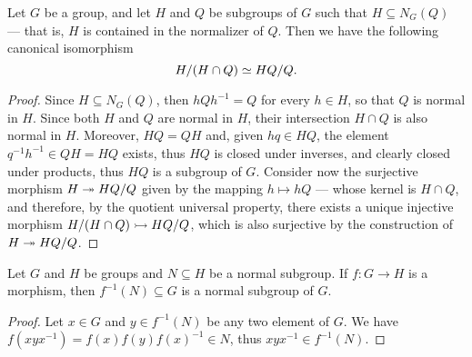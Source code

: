 \begin{corollary}
\label{cor:grp-intersection-coset-isomorphism}
Let \(G\) be a group, and let \(H\) and \(Q\) be subgroups of \(G\) such that
\(H \subseteq N_G(Q)\) --- that is, \(H\) is contained in the normalizer of
\(Q\). Then we have the following canonical isomorphism
\[
  H/(H \cap Q) \simeq H Q / Q.
\]
\end{corollary}

\begin{proof}
Since \(H \subseteq N_G(Q)\), then \(hQh^{-1} = Q\) for every \(h \in H\), so
that \(Q\) is normal in \(H\). Since both \(H\) and \(Q\) are normal in \(H\),
their intersection \(H \cap Q\) is also normal in \(H\). Moreover, \(HQ = QH\)
and, given \(hq \in HQ\), the element \(q^{-1} h^{-1} \in Q H = H Q\) exists, thus
\(HQ\) is closed under inverses, and clearly closed under products, thus \(HQ\)
is a subgroup of \(G\). Consider now the surjective morphism \(H \twoheadrightarrow H Q / Q\)
given by the mapping \(h \mapsto h Q\) --- whose kernel is \(H \cap Q\), and
therefore, by the quotient universal property, there exists a unique injective
morphism \(H/(H \cap Q) \rightarrowtail HQ/Q\), which is also surjective by the
construction of \(H \twoheadrightarrow H Q / Q\).
\end{proof}

\begin{proposition}
\label{prop:morphisms-preserve-normality}
Let \(G\) and \(H\) be groups and \(N \subseteq H\) be a normal subgroup. If
\(f: G \to H\) is a morphism, then \(f^{-1}(N) \subseteq G\) is a normal
subgroup of \(G\).
\end{proposition}

\begin{proof}
Let \(x \in G\) and \(y \in f^{-1}(N)\) be any two element of \(G\). We have
\(f(x y x^{-1}) = f(x) f(y) f(x)^{-1} \in N\), thus \(x y x^{-1} \in f^{-1}(N)\).
\end{proof}

